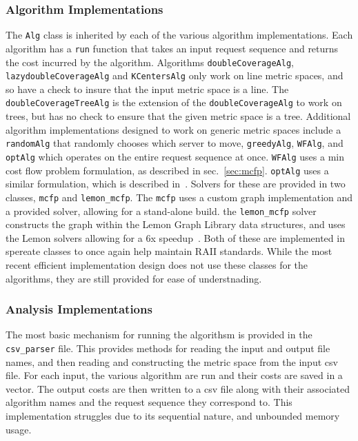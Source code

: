 \subsubsection*{Algorithm Implementations}

The \texttt{Alg} class is inherited by each of the various algorithm implementations. Each algorithm has a \texttt{run} function that takes an input request sequence and returns the cost incurred by the algorithm. Algorithms \texttt{doubleCoverageAlg}, \texttt{lazydoubleCoverageAlg} and \texttt{KCentersAlg} only work on line metric spaces, and so have a check to insure that the input metric space is a line. The \texttt{doubleCoverageTreeAlg} is the extension of the \texttt{doubleCoverageAlg} to work on trees, but has no check to ensure that the given metric space is a tree. Additional algorithm implementations designed to work on generic metric spaces include a \texttt{randomAlg} that randomly chooses which server to move, \texttt{greedyAlg}, \texttt{WFAlg}, and \texttt{optAlg} which operates on the entire request sequence at once. \texttt{WFAlg} uses a min cost flow problem formulation, as described in sec.~\ref{sec:mcfp}. \texttt{optAlg} uses a similar formulation, which is described in~\cite{mcfp2011}. Solvers for these are provided in two classes, \texttt{mcfp} and \texttt{lemon\_mcfp}. The \texttt{mcfp} uses a custom graph implementation and a provided solver, allowing for a stand-alone build. the \texttt{lemon\_mcfp} solver constructs the graph within the Lemon Graph Library data structures, and uses the Lemon solvers allowing for a 6x speedup~\cite{lemon}. Both of these are implemented in spereate classes to once again help maintain RAII standards. While the most recent efficient implementation design does not use these classes for the algorithms, they are still provided for ease of understnading.

\subsubsection*{Analysis Implementations}

The most basic mechanism for running the algorithsm is provided in the \texttt{csv\_parser} file. This provides methods for reading the input and output file names, and then reading and constructing the metric space from the input csv file. For each input, the various algorithm are run and their costs are saved in a vector. The output costs are then written to a csv file along with their associated algorithm names and the request sequence they correspond to. This implementation struggles due to its sequential nature, and unbounded memory usage.

